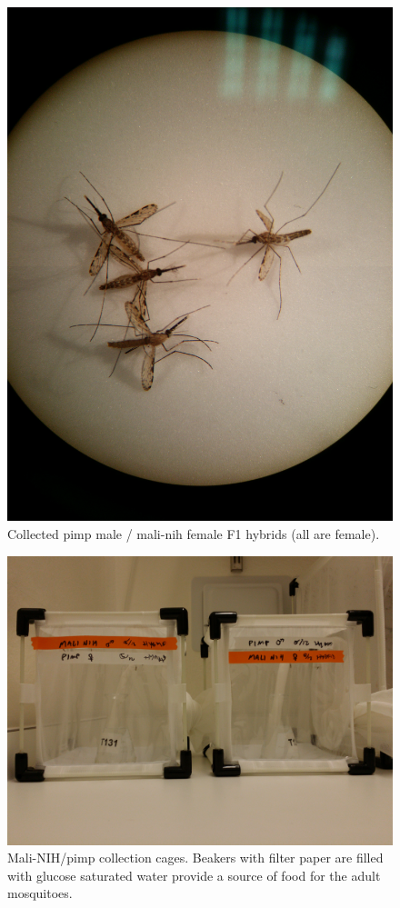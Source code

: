 \documentclass{article}
\begin{document}
\begin{figure}[p]
\includegraphics[scale=0.1, angle=90]{pimp-♂_mali-NIH-♀}
\caption{Collected pimp male / mali-nih female F1 hybrids (all are female).}
\label{fig:pimpmalemalifemale}
\end{figure}

\begin{figure}[p]
\includegraphics[scale=0.1]{cages}
\caption{Mali-NIH/pimp collection cages. Beakers with filter paper are filled with glucose saturated water provide a source of food for the adult mosquitoes.}
\end{figure}
\end{document}
